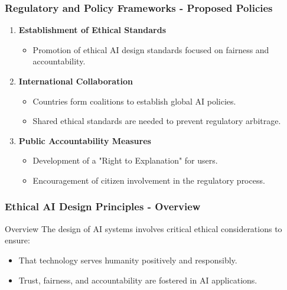 \documentclass[aspectratio=169]{beamer}
\begin{document}
\begin{frame}[fragile]
    \frametitle{Regulatory and Policy Frameworks - Proposed Policies}
    \begin{enumerate}
        \item \textbf{Establishment of Ethical Standards}
            \begin{itemize}
                \item Promotion of ethical AI design standards focused on fairness and accountability.
            \end{itemize}
        \item \textbf{International Collaboration}
            \begin{itemize}
                \item Countries form coalitions to establish global AI policies.
                \item Shared ethical standards are needed to prevent regulatory arbitrage.
            \end{itemize}
        \item \textbf{Public Accountability Measures}
            \begin{itemize}
                \item Development of a "Right to Explanation" for users.
                \item Encouragement of citizen involvement in the regulatory process.
            \end{itemize}
    \end{enumerate}
\end{frame}

\begin{frame}[fragile]
    \frametitle{Ethical AI Design Principles - Overview}
    \begin{block}{Overview}
        The design of AI systems involves critical ethical considerations to ensure:
        \begin{itemize}
            \item That technology serves humanity positively and responsibly.
            \item Trust, fairness, and accountability are fostered in AI applications.
        \end{itemize}
    \end{block}
\end{frame}
\end{document}
